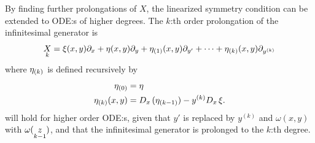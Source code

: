 By finding further prolongations of \(X\), the linearized symmetry condition can be extended to ODE:s of higher degrees.
The \(k\):th order prolongation of the infinitesimal generator is
\begin{equation}
  \prolong{X}{k} = \xi(x,y) \partial_x + \eta(x,y) \partial_y + \prolongpart{\eta}{1}(x,y) \partial_{y'} + \dots + \prolongpart{\eta}{k}(x,y) \partial_{y^{(k)}}
\end{equation}
where \(\prolongpart{\eta}{k}\) is defined recursively by
\begin{align}
  \prolongpart{\eta}{0} &= \eta\\
  \prolongpart{\eta}{k}(x,y) &= \tD{x}(\prolongpart{\eta}{k-1}) - y^{(k)} \tD{x} \xi.
\end{align}
 will hold for higher order ODE:s, given that \(y'\) is replaced by \(y^{(k)}\) and \(\omega(x,y)\) with \(\omega(\prolong{z}{k-1})\), and that the infinitesimal generator is prolonged to the \(k\):th degree.


